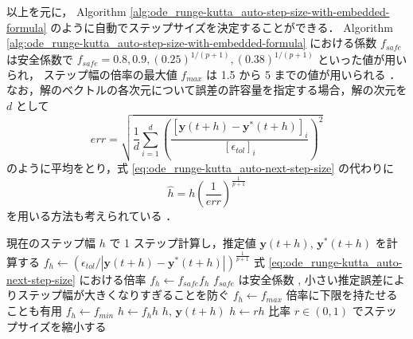 以上を元に，
Algorithm \ref{alg:ode_runge-kutta_auto-step-size-with-embedded-formula}
のように自動でステップサイズを決定することができる．
Algorithm \ref{alg:ode_runge-kutta_auto-step-size-with-embedded-formula}
における係数 $f_{safe}$ は安全係数で
$f_{safe} = 0.8, 0.9, (0.25)^{1/(p+1)}, (0.38)^{1/(p+1)}$
といった値が用いられ，
ステップ幅の倍率の最大値 $f_{max}$ は
1.5 から 5 までの値が用いられる
\cite[Section II.4]{Hairer1993}．
なお，解のベクトルの各次元について誤差の許容量を指定する場合，解の次元を $d$ として
\begin{equation}
    err = \sqrt{\frac{1}{d} \sum_{i=1}^d \left(\frac{[\bm{y}(t + h) - \bm{y}^*(t + h)]_i}{[\epsilon_{tol}]_i} \right)^2}
    \label{eq:ode_runge-kutta_auto-next-step-size-multi-dimension-error}
\end{equation}
のように平均をとり，式 \eqref{eq:ode_runge-kutta_auto-next-step-size} の代わりに
\begin{equation}
    \hat{h} = h
    \left(\frac{1}{err}\right)^{\frac{1}{p+1}}
    \label{eq:ode_runge-kutta_auto-next-step-size-multi-dimension}
\end{equation}
を用いる方法も考えられている
\cite[Section II.4]{Hairer1993}．

\begin{algorithm}[tbp]
    \caption{式 \eqref{eq:ode_runge-kutta_auto-next-step-size} を利用したステップサイズの自動決定 %
        \cite[4.1 節 (a)]{Mitsui1993}, \cite[Section II.4]{Hairer1993}}
    \label{alg:ode_runge-kutta_auto-step-size-with-embedded-formula}
    \begin{algorithmic}
        \Loop
        \State 現在のステップ幅 $h$ で 1 ステップ計算し，推定値 $\bm{y}(t + h)$, $\bm{y}^*(t+h)$ を計算する
        \State $f_{h} \gets \left(\epsilon_{tol} / \left| \bm{y}(t + h) - \bm{y}^*(t + h) \right|\right)^{\frac{1}{p+1}}$
        \Comment 式 \eqref{eq:ode_runge-kutta_auto-next-step-size} における倍率
        \State $f_h \gets f_{safe} f_h$
        \Comment $f_{safe}$ は安全係数 \cite[4.1 節 (a)]{Mitsui1993}, \cite[Section II.4]{Hairer1993}
        \Comment 小さい推定誤差によりステップ幅が大きくなりすぎることを防ぐ \cite[Section II.4]{Hairer1993}
        \State $f_h \gets f_{max}$
        \EndIf
        \Comment 倍率に下限を持たせることも有用 \cite[Section II.4]{Hairer1993}
        \State $f_h \gets f_{min}$
        \EndIf
        \State $h \gets f_h h$
        \State \Return $h$, $\bm{y}(t + h)$
        \EndIf
        \State $h \gets r h$ \Comment 比率 $r \in (0, 1)$ でステップサイズを縮小する
        \EndLoop
        \EndProcedure
    \end{algorithmic}
\end{algorithm}

